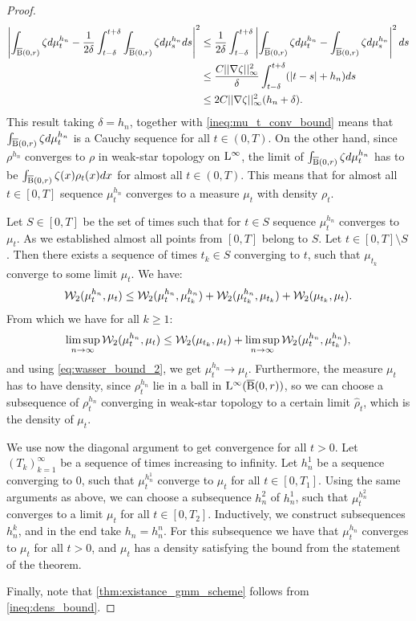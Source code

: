 \begin{proof}
\[\begin{aligned}
\left| \int_{\operatorname{\overline{B}}(0,r)} \zeta d\mu_t^{h_n} - \frac{1}{2\delta} \int_{t - \delta}^{t + \delta} \int_{\operatorname{\overline{B}}(0,r)} \zeta d\mu_s^{h_n} ds \right|^2 & \leq \frac{1}{2\delta} \int_{t - \delta}^{t + \delta} \left| \int_{\operatorname{\overline{B}}(0,r)} \zeta d\mu_{t}^{h_n} - \int_{\operatorname{\overline{B}}(0,r)} \zeta d\mu_s^{h_n} \right|^2 ds \\
& \leq \frac{C ||\nabla \zeta||_{\infty}^2}{\delta} \int_{t-\delta}^{t+\delta} (|t-s| +h_n) ds \\
& \leq 2C ||\nabla \zeta||_{\infty}^2 (h_n + \delta).
\end{aligned}
\]
This result taking $\delta = h_n$, together with \eqref{ineq:mu_t_conv_bound} means that $\int_{\operatorname{\overline{B}}(0,r)} \zeta d\mu_t^{h_n}$ is a Cauchy sequence for all $t \in (0, T)$. On the other hand, since $\rho^{h_n}$ converges to $\rho$ in weak-star topology on $\mathrm{L}^{\infty}$, the limit of $\int_{\operatorname{\overline{B}}(0,r)} \zeta d\mu_t^{h_n}$ has to be $\int_{\operatorname{\overline{B}}(0,r)} \zeta(x) \rho_t(x) dx$ for almost all $t \in (0,T)$. This means that for almost all $t \in [0,T]$ sequence $\mu_{t}^{h_n}$ converges to a measure $\mu_t$ with density $\rho_t$.

Let $ S \in [0,T]$ be the set of times such that for $t \in S$ sequence $\mu_{t}^{h_n}$ converges to $\mu_t$. As we established almost all points from $[0,T]$ belong to $S$. Let $ t \in [0,T] \setminus S$. Then there exists a sequence of times $t_k \in S$ converging to $t$, such that $\mu_{t_k}$ converge to some limit $\mu_t$. We have:
\[
{\cal W}_2(\mu_t^{h_n}, \mu_t) \leq {\cal W}_2(\mu_{t}^{h_n}, \mu_{t_k}^{h_n}) + {\cal W}_2(\mu_{t_k}^{h_n}, \mu_{t_k}) + {\cal W}_2(\mu_{t_k}, \mu_t).
\]
From which we have for all $k \geq 1$:
\[
\limsup_{n \rightarrow \infty} {\cal W}_2(\mu_{t}^{h_n}, \mu_t) \leq {\cal W}_2(\mu_{t_k}, \mu_t) + \limsup_{n\rightarrow \infty} {\cal W}_2(\mu_t^{h_n}, \mu_{t_k}^{h_n}),
\]
and using \eqref{eq:wasser_bound_2}, we get $\mu_{t}^{h_n} \rightarrow \mu_t$. Furthermore, the measure $\mu_t$ has to have density, since $\rho_{t}^{h_n}$ lie in a ball in $\mathrm{L}^{\infty}(\operatorname{\overline{B}}(0,r))$, so we can choose a subsequence of $\rho_t^{h_n}$ converging in weak-star topology to a certain limit $\hat{\rho}_t$, which is the density of $\mu_t$. 

We use now the diagonal argument to get convergence for all $t >0$. Let $(T_k)_{k=1}^{\infty}$ be a sequence of times increasing to infinity. Let $h_{n}^1$ be a sequence converging to $0$, such that $\mu_t^{h_n^1}$ converge to $\mu_t$ for all $t \in [0, T_1]$. Using the same arguments as above, we can choose a subsequence $h_n^2$ of $h_n^1$, such that $\mu_{t}^{h_n^2}$ converges to a limit $\mu_t$ for all $t \in [0, T_2]$. Inductively, we construct subsequences $h_{n}^k$, and in the end take $h_n = h_n^n$. For this subsequence we have that $\mu_t^{h_n}$ converges to $\mu_t$ for all $t > 0$, and $\mu_t$ has a density satisfying the bound from the statement of the theorem.

Finally, note that \eqref{thm:existance_gmm_scheme} follows from \eqref{ineq:dens_bound}.
\end{proof}

